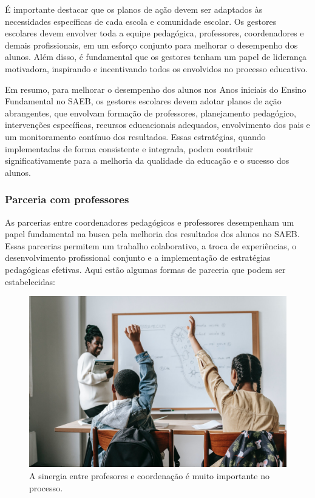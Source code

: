 É importante destacar que os planos de ação devem ser adaptados às
necessidades específicas de cada escola e comunidade escolar. Os
gestores escolares devem envolver toda a equipe pedagógica, professores,
coordenadores e demais profissionais, em um esforço conjunto para
melhorar o desempenho dos alunos. Além disso, é fundamental que os
gestores tenham um papel de liderança motivadora, inspirando e
incentivando todos os envolvidos no processo educativo.

Em resumo, para melhorar o desempenho dos alunos nos Anos iniciais do
Ensino Fundamental no SAEB, os gestores escolares devem adotar planos de
ação abrangentes, que envolvam formação de professores, planejamento
pedagógico, intervenções específicas, recursos educacionais adequados,
envolvimento dos pais e um monitoramento contínuo dos resultados. Essas
estratégias, quando implementadas de forma consistente e integrada,
podem contribuir significativamente para a melhoria da qualidade da
educação e o sucesso dos alunos.

\subsubsection{Parceria com
professores}\label{parceria-com-professores}

As parcerias entre coordenadores pedagógicos e professores desempenham
um papel fundamental na busca pela melhoria dos resultados dos alunos no
SAEB. Essas parcerias permitem um trabalho colaborativo, a troca de
experiências, o desenvolvimento profissional conjunto e a implementação
de estratégias pedagógicas efetivas. Aqui estão algumas formas de
parceria que podem ser estabelecidas:

\begin{figure}
\centering
\includegraphics[width=\textwidth]{./imgs/Imagem007.jpg}
\caption{A sinergia entre profesores e coordenação é muito importante no
processo.}
\end{figure}

